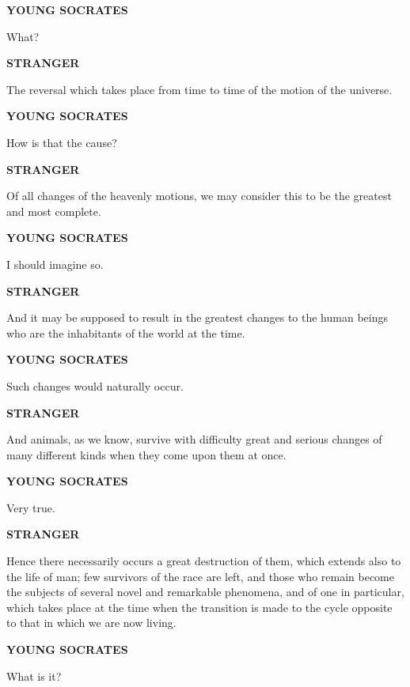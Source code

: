 \documentclass[11pt,letter]{article}
\begin{document}
\par \textbf{YOUNG SOCRATES}
\par   What?

\par \textbf{STRANGER}
\par   The reversal which takes place from time to time of the motion of the universe.

\par \textbf{YOUNG SOCRATES}
\par   How is that the cause?

\par \textbf{STRANGER}
\par   Of all changes of the heavenly motions, we may consider this to be the greatest and most complete.

\par \textbf{YOUNG SOCRATES}
\par   I should imagine so.

\par \textbf{STRANGER}
\par   And it may be supposed to result in the greatest changes to the human beings who are the inhabitants of the world at the time.

\par \textbf{YOUNG SOCRATES}
\par   Such changes would naturally occur.

\par \textbf{STRANGER}
\par   And animals, as we know, survive with difficulty great and serious changes of many different kinds when they come upon them at once.

\par \textbf{YOUNG SOCRATES}
\par   Very true.

\par \textbf{STRANGER}
\par   Hence there necessarily occurs a great destruction of them, which extends also to the life of man; few survivors of the race are left, and those who remain become the subjects of several novel and remarkable phenomena, and of one in particular, which takes place at the time when the transition is made to the cycle opposite to that in which we are now living.

\par \textbf{YOUNG SOCRATES}
\par   What is it?
\end{document}
